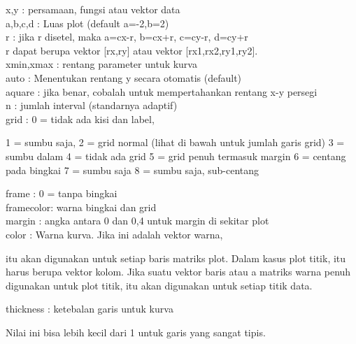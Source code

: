 \documentclass[a4paper,10pt]{article}
\begin{document}
\begin{eulernotebook}
\begin{eulercomment}
\begin{eulercomment}
\begin{eulercomment}
\begin{eulercomment}
\begin{eulercomment}
\begin{eulercomment}
\begin{eulercomment}
\begin{eulercomment}
\begin{eulercomment}
\begin{eulercomment}
\begin{eulercomment}
\begin{eulercomment}
\begin{eulercomment}
x,y       : persamaan, fungsi atau vektor data\\
a,b,c,d   : Luas plot (default a=-2,b=2)\\
r         : jika r disetel, maka a=cx-r, b=cx+r, c=cy-r, d=cy+r\\
r dapat berupa vektor [rx,ry] atau vektor [rx1,rx2,ry1,ry2].\\
xmin,xmax : rentang parameter untuk kurva\\
auto      : Menentukan rentang y secara otomatis (default)\\
aquare    : jika benar, cobalah untuk mempertahankan rentang x-y
persegi\\
n         : jumlah interval (standarnya adaptif)\\
grid      : 0 = tidak ada kisi dan label,\\
\end{eulercomment}
\begin{eulerttcomment}
            1 = sumbu saja,
            2 = grid normal (lihat di bawah untuk jumlah garis grid)
            3 = sumbu dalam
            4 = tidak ada grid
            5 = grid penuh termasuk margin
            6 = centang pada bingkai
            7 = sumbu saja
            8 = sumbu saja, sub-centang
\end{eulerttcomment}
\begin{eulercomment}
frame     : 0 = tanpa bingkai\\
framecolor: warna bingkai dan grid\\
margin    : angka antara 0 dan 0,4 untuk margin di sekitar plot\\
color     : Warna kurva. Jika ini adalah vektor warna,\\
\end{eulercomment}
\begin{eulerttcomment}
            itu akan digunakan untuk setiap baris matriks plot. Dalam
            kasus plot titik, itu harus berupa vektor kolom. Jika
            suatu vektor baris atau a matriks warna penuh
            digunakan untuk plot titik, itu akan digunakan untuk
            setiap titik data.
\end{eulerttcomment}
\begin{eulercomment}
thickness : ketebalan garis untuk kurva\\
\end{eulercomment}
\begin{eulerttcomment}
            Nilai ini bisa lebih kecil dari 1 untuk garis yang sangat
            tipis.
\end{eulerttcomment}

\end{eulercomment}
\end{eulercomment}
\end{eulercomment}
\end{eulercomment}
\end{eulercomment}
\end{eulercomment}
\end{eulercomment}
\end{eulercomment}
\end{eulercomment}
\end{eulercomment}
\end{eulercomment}
\end{eulercomment}
\end{eulernotebook}
\end{document}
